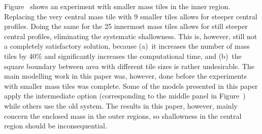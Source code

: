 Figure~ shows an experiment with smaller mass
tiles in the inner region.  Replacing the very central mass tile with
9 smaller tiles allows for steeper central profiles.  Doing the same
for the 25 innermost mass tiles allows for still steeper central
profiles, eliminating the systematic shallowness.  This is, however,
still not a completely satisfactory solution, because (a)~it increases
the number of mass tiles by 40\% and significantly increases the
computational time, and (b)~the square boundary between area with
different tile sizes is rather undesirable.
The main modelling work in this paper was, however, done before the
experiments with smaller mass tiles was complete.  Some of the models
presented in this paper apply the intermediate option (corresponding
to the middle panel in Figure~) while others use
the old system.  The results in this paper, however, mainly concern
the enclosed mass in the outer regions, so shallowness in the central
region should be inconsequential.

